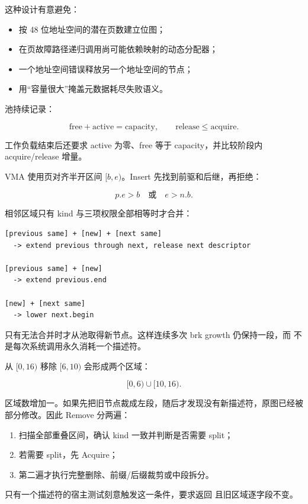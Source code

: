 这种设计有意避免：

\begin{itemize}
  \item 按 48 位地址空间的潜在页数建立位图；
  \item 在页故障路径递归调用尚可能依赖映射的动态分配器；
  \item 一个地址空间错误释放另一个地址空间的节点；
  \item 用“容量很大”掩盖元数据耗尽失败语义。
\end{itemize}

池持续记录：

\[
  \mathrm{free}+\mathrm{active}=\mathrm{capacity},
  \qquad
  \mathrm{release}\le\mathrm{acquire}.
\]

工作负载结束后还要求 active 为零、free 等于 capacity，并比较阶段内
acquire/release 增量。

VMA 使用页对齐半开区间 \([b,e)\)。Insert 先找到前驱和后继，再拒绝：

\[
  p.e>b\quad\text{或}\quad e>n.b.
\]

相邻区域只有 kind 与三项权限全部相等时才合并：

\begin{lstlisting}[caption={相邻区域的三种合并}]
[previous same] + [new] + [next same]
  -> extend previous through next, release next descriptor

[previous same] + [new]
  -> extend previous.end

[new] + [next same]
  -> lower next.begin
\end{lstlisting}

只有无法合并时才从池取得新节点。这样连续多次 brk growth 仍保持一段，而
不是每次系统调用永久消耗一个描述符。

从 \([0,16)\) 移除 \([6,10)\) 会形成两个区域：

\[
  [0,6)\cup[10,16).
\]

区域数增加一。如果先把旧节点裁成左段，随后才发现没有新描述符，原图已经被
部分修改。因此 Remove 分两遍：

\begin{enumerate}
  \item 扫描全部重叠区间，确认 kind 一致并判断是否需要 split；
  \item 若需要 split，先 Acquire；
  \item 第二遍才执行完整删除、前缀/后缀裁剪或中段拆分。
\end{enumerate}

只有一个描述符的宿主测试刻意触发这一条件，要求返回
 且旧区域逐字段不变。

